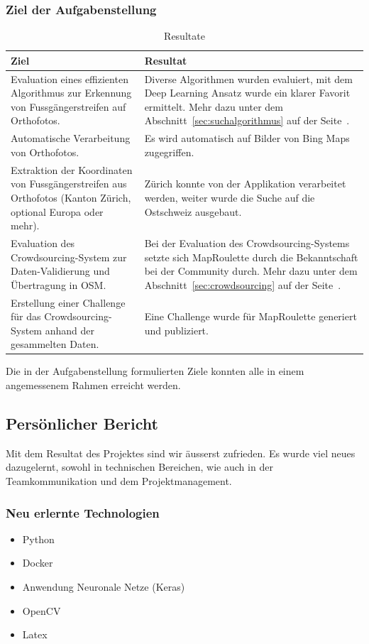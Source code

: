 \subsubsection{Ziel der Aufgabenstellung}
\begin{table}[H]
    \begin{tabular}{|p{6cm}|p{8cm}|}
    \hline    
    \rowcolor{lightblue}
	Ziel & Resultat \\ \hline
	Evaluation eines effizienten Algorithmus zur Erkennung von Fussgängerstreifen auf Orthofotos. & Diverse Algorithmen wurden evaluiert, mit dem Deep Learning Ansatz wurde ein klarer Favorit ermittelt. Mehr dazu unter dem Abschnitt~\ref{sec:suchalgorithmus} auf der Seite~\pageref{sec:suchalgorithmus}.\\ \hline
	Automatische Verarbeitung von Orthofotos. & Es wird automatisch auf Bilder von Bing Maps zugegriffen.\\ \hline
	Extraktion der Koordinaten von Fussgängerstreifen aus Orthofotos (Kanton Zürich, optional Europa oder mehr). & Zürich konnte von der Applikation verarbeitet werden, weiter wurde die Suche auf die Ostschweiz ausgebaut. \\ \hline
	Evaluation des Crowdsourcing-System zur Daten-Validierung und Übertragung in OSM.& Bei der Evaluation des Crowdsourcing-Systems setzte sich MapRoulette durch die Bekanntschaft bei der Community durch. Mehr dazu unter dem Abschnitt~\ref{sec:crowdsourcing} auf der Seite~\pageref{sec:crowdsourcing}. \\ \hline
	Erstellung einer Challenge für das Crowdsourcing-System anhand der gesammelten Daten. & Eine Challenge wurde für MapRoulette generiert und publiziert.\\ \hline
    \end{tabular}
    \caption[Resultate]{Resultate}
\end{table}
Die in der Aufgabenstellung formulierten Ziele konnten alle in einem angemessenem Rahmen erreicht werden. 

\newpage
\subsection{Persönlicher Bericht}
Mit dem Resultat des Projektes sind wir äusserst zufrieden. Es wurde viel neues dazugelernt, sowohl in technischen Bereichen, wie auch in der Teamkommunikation und dem Projektmanagement.
\subsubsection{Neu erlernte Technologien}
\begin{itemize}
	\item Python
	\item \Gls{Docker}
	\item Anwendung Neuronale Netze (Keras)
	\item \Gls{OpenCV}
	\item Latex
\end{itemize}

